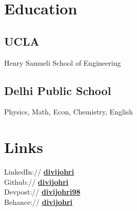 \documentclass[letterpaper]{deedy-resume} %
\begin{document}
\begin{minipage}[t]{0.33\textwidth} %


\section{Education} 

\subsection{UCLA}

Henry Samueli School of Engineering\\

\sectionspace %


\subsection{Delhi Public School}

Physics, Math, Econ, Chemistry, English\\

\sectionspace %


\section{Links} 

LinkedIn:// \href{https://www.linkedin.com/in/divijohri}{\bf divijohri} \\
Github:// \href{https://github.com/divijohri}{\bf divijohri} \\
Devpost:// \href{https://devpost.com/divijohri98}{\bf divijohri98} \\
Behance:// \href{https://www.behance.net/divijohri}{\bf divijohri} \\


\end{minipage}
\end{document}
